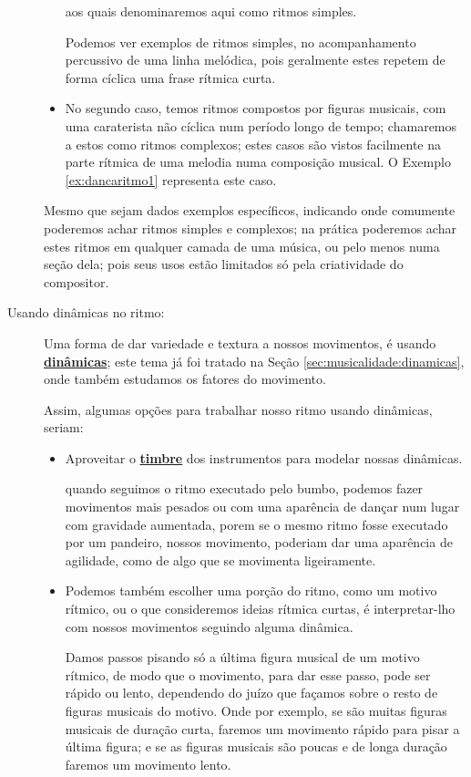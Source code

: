 \begin{description}
\begin{itemize}
aos quais denominaremos aqui como ritmos simples.
\begin{example}
 Podemos ver exemplos de ritmos simples,
no acompanhamento percussivo de uma linha melódica, 
pois geralmente estes repetem de forma cíclica uma frase rítmica curta.
\end{example}
\item No segundo caso, temos  ritmos compostos por figuras musicais,
com uma caraterista não cíclica num período longo de tempo; 
chamaremos a estos como ritmos complexos;
estes casos são vistos facilmente na parte rítmica de uma melodia numa composição musical.
O Exemplo \ref{ex:dancaritmo1} representa este caso.
\end{itemize}
Mesmo que sejam dados exemplos específicos, 
indicando onde comumente poderemos achar ritmos simples e complexos;
na prática poderemos achar estes ritmos em qualquer camada de uma música,
ou pelo menos numa seção dela; 
pois seus usos estão limitados só pela criatividade do compositor.
\item [Usando dinâmicas no ritmo:] 
Uma forma de dar variedade e textura a nossos movimentos, 
é usando \hyperref[sec:musicalidade:dinamicas]{\textbf{dinâmicas}}; este tema já foi tratado na Seção \ref{sec:musicalidade:dinamicas},
onde também estudamos os fatores do movimento.

Assim, algumas opções para trabalhar nosso ritmo usando dinâmicas, seriam:
\begin{itemize}
\item Aproveitar o \hyperref[sec:pos:timbre]{\textbf{timbre}} dos instrumentos para modelar nossas dinâmicas.
\begin{example}
\label{ex:danceritmo:bumbopandeiro}
quando seguimos  o ritmo executado pelo bumbo,
podemos fazer movimentos mais pesados ou com uma aparência de dançar num lugar com gravidade aumentada,
porem se o mesmo ritmo fosse executado por um pandeiro,
nossos movimento,
poderiam dar uma aparência de agilidade, 
como de algo que se movimenta ligeiramente.
\end{example}
\item Podemos também escolher uma porção do ritmo, como um motivo rítmico,
 ou o que consideremos ideias rítmica curtas,
é interpretar-lho com nossos movimentos seguindo alguma dinâmica.
\begin{example}
Damos passos pisando só a última figura musical de um motivo rítmico,
de modo que o movimento, para dar esse passo, pode ser rápido ou lento,
dependendo do juízo que façamos sobre o resto de figuras musicais do motivo.
Onde por exemplo, se são muitas figuras musicais de duração curta, 
faremos um movimento rápido para pisar a última figura;
e se as figuras musicais são poucas e de longa duração faremos um movimento lento.
\end{example}
\end{itemize}
\end{description}

